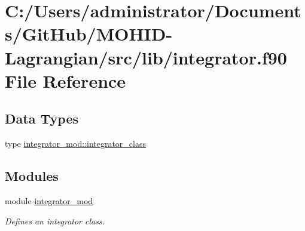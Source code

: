 \hypertarget{integrator_8f90}{}\section{C\+:/\+Users/administrator/\+Documents/\+Git\+Hub/\+M\+O\+H\+I\+D-\/\+Lagrangian/src/lib/integrator.f90 File Reference}
\label{integrator_8f90}
\subsection*{Data Types}
\begin{DoxyCompactItemize}
\item 
type \mbox{\hyperlink{structintegrator__mod_1_1integrator__class}{integrator\+\_\+mod\+::integrator\+\_\+class}}
\end{DoxyCompactItemize}
\subsection*{Modules}
\begin{DoxyCompactItemize}
\item 
module \mbox{\hyperlink{namespaceintegrator__mod}{integrator\+\_\+mod}}
\begin{DoxyCompactList}\small\item\em Defines an integrator class. \end{DoxyCompactList}\end{DoxyCompactItemize}
